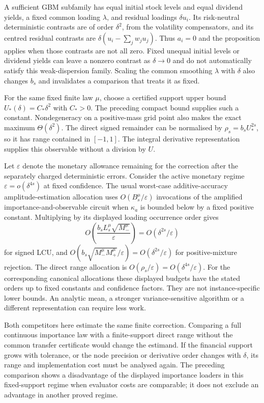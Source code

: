 A sufficient GBM subfamily has equal initial stock levels and equal
dividend yields, a fixed common loading $\lambda$, and residual
loadings $\delta u_i$. Its risk-neutral deterministic contrasts are
of order $\delta^2$, from the volatility compensators, and its
centred residual contrasts are
$\delta(u_i-\sum_jw_j u_j)$. Thus $a_i=0$ and the proposition
applies when those contrasts are not all zero.
Fixed unequal initial levels or dividend yields can leave a nonzero
contrast as $\delta\to0$ and do not automatically satisfy this
weak-dispersion family. Scaling the common smoothing $\lambda$
with $\delta$ also changes $b_s$ and invalidates a comparison that
treats it as fixed.

For the same fixed finite law $\mu$, choose a certified support upper
bound $U_*(\delta)=C_*\delta^2$ with $C_*>0$.
The preceding compact bound supplies such a constant.
Nondegeneracy on a positive-mass grid point also makes the exact
maximum $\Theta(\delta^2)$.
The direct signed remainder can be normalised by
$\rho_s=b_sU_*^{2s}$, so it has range contained in $[-1,1]$.
The integral derivative representation supplies this observable
without a division by $U$.

Let $\varepsilon$ denote the monetary allowance remaining for the
correction after the separately charged deterministic errors.
Consider the active monetary regime
$\varepsilon=o(\delta^{4s})$ at fixed confidence.
The usual worst-case additive-accuracy amplitude-estimation allocation
uses $O(B_s^\mu/\varepsilon)$ invocations of the amplified
importance-and-observable circuit when $\kappa_a$ is bounded below
by a fixed positive constant.
Multiplying by its displayed loading occurrence order gives
\[
 O\!\left(\frac{b_s L_s^\mu\sqrt{M_-^\mu}}{\varepsilon}\right)
       =O(\delta^{2s}/\varepsilon)
\]
for signed LCU, and
$O(b_s\sqrt{M_-^\mu M_+^\mu}/\varepsilon)
=O(\delta^{2s}/\varepsilon)$ for positive-mixture rejection.
The direct range allocation is $O(\rho_s/\varepsilon)
=O(\delta^{4s}/\varepsilon)$.
For the corresponding canonical allocations these displayed budgets
have the stated orders up to fixed constants and confidence factors.
They are not instance-specific lower bounds. An analytic mean,
a stronger variance-sensitive algorithm or a different representation
can require less work.

Both competitors here estimate the same finite correction.
Comparing a full continuous importance law with a finite-support
direct range without the common transfer certificate would change
the estimand. If the financial support grows with tolerance, or
the node precision or derivative order changes with $\delta$, its
range and implementation cost must be analysed again.
The preceding comparison shows a disadvantage of the displayed
importance loaders in this fixed-support regime when evaluator
costs are comparable; it does not exclude an advantage in another
proved regime.


